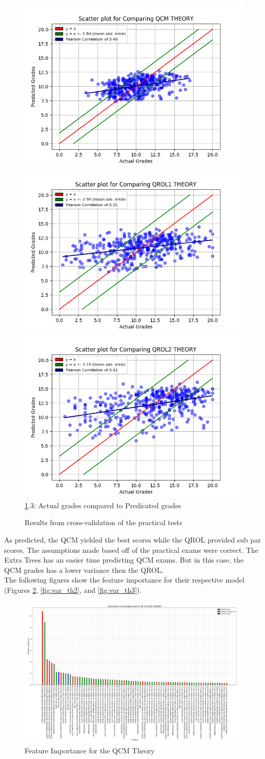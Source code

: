 \documentclass[a4paper,11pt]{report}
\numberwithin{figure}{chapter} %
\begin{document}
\begin{figure}[H]
      \includegraphics[width=.30\linewidth]{plots/cv_comp_QCM_THEORY_2018-04-30_13_57_05.png}
      \includegraphics[width=.30\linewidth]{plots/cv_comp_QROL1_THEORY_2018-04-30_13_40_50.png}
  	  \includegraphics[width=.30\linewidth]{plots/cv_comp_QROL2_THEORY_2018-04-30_13_12_52.png}
      \\
      \ref{fig:results_theo}.3: Actual grades compared to Predicated grades
      \caption{Results from cross-validation of the practical tests}
      \label{fig:results_theo}
    \end{figure}

    As predicted, the QCM yielded the best scores while the QROL provided sub par scores.
    The assumptions made based off of the practical exams were correct.
    The Extra Trees has an easier time predicting QCM exams.
    But in this case, the QCM grades has a lower variance then the QROL.\\


    The following figures show the feature importance for their respective model (Figures \ref{fig:var_th1}, \ref{fig:var_th2}, and \ref{fig:var_th3}).

     \begin{figure}[H]
      \centering
      \includegraphics[width=.95\linewidth]{plots/var_importance_QCM_THEORY_2018-05-02_20_53_18.png}
      \caption{Feature Importance for the QCM Theory}
      \label{fig:var_th1}
      \end{figure}
\end{document}

